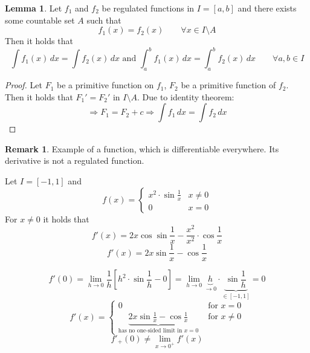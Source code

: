 \documentclass[a4paper,landscape,twocolumn]{article}
\theoremstyle{definition}
\newtheorem{rem}{Remark}
\newtheorem{lemma}{Lemma}
\begin{document}
\begin{lemma}
  Let $f_1$ and $f_2$ be regulated functions in $I = [a,b]$ and
  there exists some countable set $A$ such that
  \[ f_1(x) = f_2(x) \qquad \forall x \in I \setminus A \]
  Then it holds that
  \[
    \int f_1(x) \, dx = \int f_2(x) \, dx \text{ and } \int_a^b f_1(x) \, dx = \int_a^b f_2(x) \, dx
    \qquad \forall a,b \in I
  \]
\end{lemma}
\begin{proof}
  Let $F_1$ be a primitive function on $f_1$, $F_2$ be a primitive function of $f_2$.
  Then it holds that $F_1' = F_2'$ in $I \setminus A$.
  Due to identity theorem:
  \[ \Rightarrow F_1 = F_2 + c \Rightarrow \int f_1 \, dx = \int f_2 \, dx \]
\end{proof}

\begin{rem}
  Example of a function, which is differentiable everywhere.
  Its derivative is not a regulated function.

  Let $I = [-1,1]$ and
  \[
    f(x) = \begin{cases}
      x^2 \cdot \sin{\frac1x} & x \neq 0 \\
      0                       & x = 0
    \end{cases}
  \]
  For $x \neq 0$ it holds that
  \[ f'(x) = 2x \cos \sin{\frac1x} - \frac{x^2}{x^2} \cdot \cos{\frac1x} \]
  \[ f'(x) = 2x \sin{\frac1x} - \cos{\frac1x} \]

  \[
    f'(0)
      = \lim_{h\to0} \frac1h \left[h^2 \cdot \sin{\frac1h} - 0\right]
      = \lim_{h\to0} \underbrace{h}_{\to0} \cdot \underbrace{\sin{\frac1h}}_{\in [-1,1]}
      = 0
  \] \[
    f'(x) = \begin{cases}
      0 & \text{ for } x = 0 \\
      \underbrace{2x \sin{\frac1x} - \cos{\frac1x}}_{\text{has no one-sided limit in } x = 0} & \text{ for } x \neq 0
    \end{cases}
  \] \[
    f'_+(0) \neq \lim_{x\to 0^+} f'(x)
  \]
\end{rem}
\end{document}
